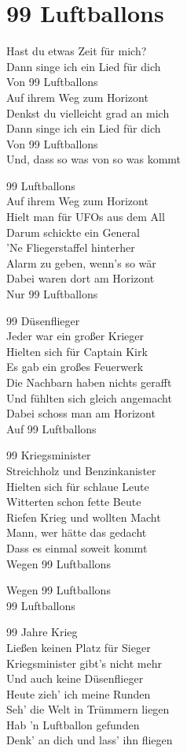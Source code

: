 \section{99 Luftballons}
Hast du etwas Zeit für mich?\\
Dann singe ich ein Lied für dich\\
Von 99 Luftballons\\
Auf ihrem Weg zum Horizont\\
Denkst du vielleicht grad an mich\\
Dann singe ich ein Lied für dich\\
Von 99 Luftballons\\
Und, dass so was von so was kommt

99 Luftballons\\
Auf ihrem Weg zum Horizont\\
Hielt man für UFOs aus dem All\\
Darum schickte ein General\\
'Ne Fliegerstaffel hinterher\\
Alarm zu geben, wenn's so wär\\
Dabei waren dort am Horizont\\
Nur 99 Luftballons

99 Düsenflieger\\
Jeder war ein großer Krieger\\
Hielten sich für Captain Kirk\\
Es gab ein großes Feuerwerk\\
Die Nachbarn haben nichts gerafft\\
Und fühlten sich gleich angemacht\\
Dabei schoss man am Horizont\\
Auf 99 Luftballons

99 Kriegsminister\\
Streichholz und Benzinkanister\\
Hielten sich für schlaue Leute\\
Witterten schon fette Beute\\
Riefen Krieg und wollten Macht\\
Mann, wer hätte das gedacht\\
Dass es einmal soweit kommt\\
Wegen 99 Luftballons

Wegen 99 Luftballons\\
99 Luftballons

99 Jahre Krieg\\
Ließen keinen Platz für Sieger\\
Kriegsminister gibt's nicht mehr\\
Und auch keine Düsenflieger\\
Heute zieh' ich meine Runden\\
Seh' die Welt in Trümmern liegen\\
Hab 'n Luftballon gefunden\\
Denk' an dich und lass' ihn fliegen